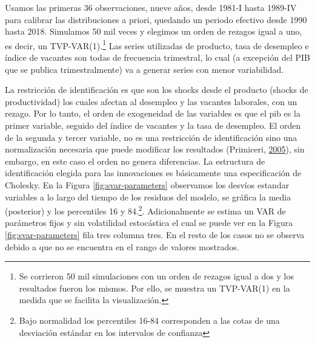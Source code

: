 \documentclass[12pt,oneside]{reedthesis}
\begin{document}
Usamos las primeras 36 observaciones, nueve años, desde 1981-I hasta 1989-IV para calibrar las distribuciones a priori, quedando un periodo efectivo desde 1990 hasta 2018. Simulamos 50 mil veces y elegimos un orden de rezagos igual a uno, es decir, un TVP-VAR(1).\footnote{Se corrieron 50 mil simulaciones con un orden de rezagos igual a dos y los resultados fueron los mismos. Por ello, se muestra un TVP-VAR(1) en la medida que se facilita la visualización.} Las series utilizadas de producto, tasa de desempleo e índice de vacantes son todas de frecuencia trimestral, lo cual (a excepción del PIB que se publica trimestralmente) va a generar series con menor variabilidad.

La restricción de identificación es que son los shocks desde el producto (shocks de productividad) los cuales afectan al desempleo y las vacantes laborales, con un rezago. Por lo tanto, el orden de exogeneidad de las variables es que el pib es la primer variable, seguido del índice de vacantes y la tasa de desempleo. El orden de la segunda y tercer variable, no es una restricción de identificación sino una normalización necesaria que puede modificar los resultados (Primiceri, \protect\hyperlink{ref-Primiceri2005}{2005}), sin embargo, en este caso el orden no genera diferencias. La estructura de identificación elegida para las innovaciones es básicamente una especificación de Cholesky. En la Figura \ref{fig:svar-parameters} observamos los desvíos estandar variables a lo largo del tiempo de los residuos del modelo, se gráfica la media (posterior) y los percentiles 16 y 84.\footnote{Bajo normalidad los percentiles 16-84 corresponden a las cotas de una desviación estándar en los intervalos de confianza}. Adicionalmente se estima un VAR de parámetros fijos y sin volatilidad estocástica el cual se puede ver en la Figura \ref{fig:svar-parameters} fila tres columna tres. En el resto de los casos no se observa debido a que no se encuentra en el rango de valores mostrados.
\end{document}

